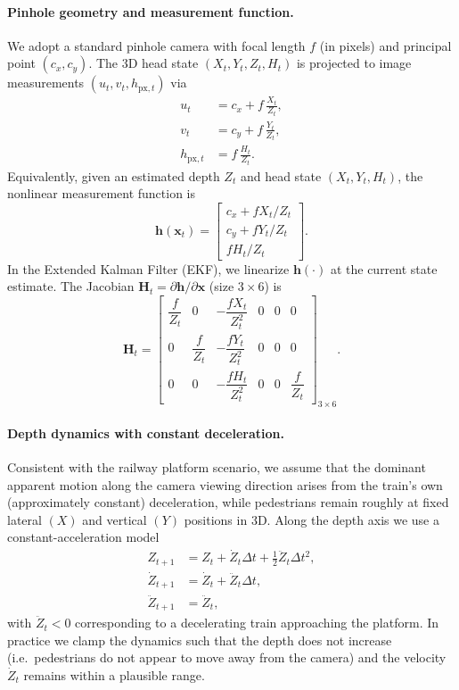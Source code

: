\paragraph{Pinhole geometry and measurement function.}
We adopt a standard pinhole camera with focal length $f$ (in pixels) and principal point $(c_x, c_y)$. The 3D head state $(X_t, Y_t, Z_t, H_t)$ is projected to image measurements $(u_t, v_t, h_{\text{px},t})$ via
\begin{equation}
\label{eq:xyz6d_pinhole}
\begin{aligned}
u_t &= c_x + f\,\frac{X_t}{Z_t}, \\
v_t &= c_y + f\,\frac{Y_t}{Z_t}, \\
h_{\text{px},t} &= f\,\frac{H_t}{Z_t}.
\end{aligned}
\end{equation}
Equivalently, given an estimated depth $Z_t$ and head state $(X_t, Y_t, H_t)$, the nonlinear measurement function is
\begin{equation}
\mathbf{h}(\mathbf{x}_t)
=
\begin{bmatrix}
  c_x + f X_t/Z_t \\
  c_y + f Y_t/Z_t \\
  f H_t/Z_t
\end{bmatrix}.
\end{equation}
In the Extended Kalman Filter (EKF), we linearize $\mathbf{h}(\cdot)$ at the current state estimate. The Jacobian $\mathbf{H}_t = \partial \mathbf{h}/\partial \mathbf{x}$ (size $3\times 6$) is
\begin{equation}
\label{eq:xyz6d_jacobian}
\mathbf{H}_t =
\begin{bmatrix}
  \dfrac{f}{Z_t} & 0 & -\dfrac{f X_t}{Z_t^2} & 0 & 0 & 0 \\
  0 & \dfrac{f}{Z_t} & -\dfrac{f Y_t}{Z_t^2} & 0 & 0 & 0 \\
  0 & 0 & -\dfrac{f H_t}{Z_t^2} & 0 & 0 & \dfrac{f}{Z_t}
\end{bmatrix}_{3\times 6}.
\end{equation}

\paragraph{Depth dynamics with constant deceleration.}
Consistent with the railway platform scenario, we assume that the dominant apparent motion along the camera viewing direction arises from the train's own (approximately constant) deceleration, while pedestrians remain roughly at fixed lateral $(X)$ and vertical $(Y)$ positions in 3D. Along the depth axis we use a constant-acceleration model
\begin{align}
Z_{t+1} &= Z_t + \dot{Z}_t \Delta t + \tfrac{1}{2}\ddot{Z}_t \Delta t^2, \\
\dot{Z}_{t+1} &= \dot{Z}_t + \ddot{Z}_t \Delta t, \\
\ddot{Z}_{t+1} &= \ddot{Z}_t,
\end{align}
with $\ddot{Z}_t < 0$ corresponding to a decelerating train approaching the platform. In practice we clamp the dynamics such that the depth does not increase (i.e.\ pedestrians do not appear to move away from the camera) and the velocity $\dot{Z}_t$ remains within a plausible range.

